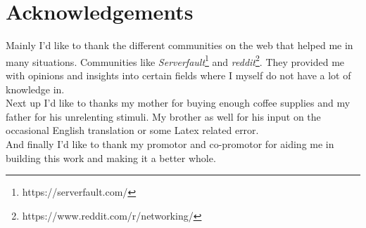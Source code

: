 \section*{Acknowledgements}
Mainly I'd like to thank the different communities on the web that helped me in many situations. Communities like \textit{Serverfault}\footnote{https://serverfault.com/} and \textit{reddit}\footnote{https://www.reddit.com/r/networking/}. They provided me with opinions and insights into certain fields where I myself do not have a lot of knowledge in.\\
Next up I'd like to thanks my mother for buying enough coffee supplies and my father for his unrelenting stimuli. My brother as well for his input on the occasional English translation or some Latex related error.\\
And finally I'd like to thank my promotor and co-promotor for aiding me in building this work and making it a better whole.